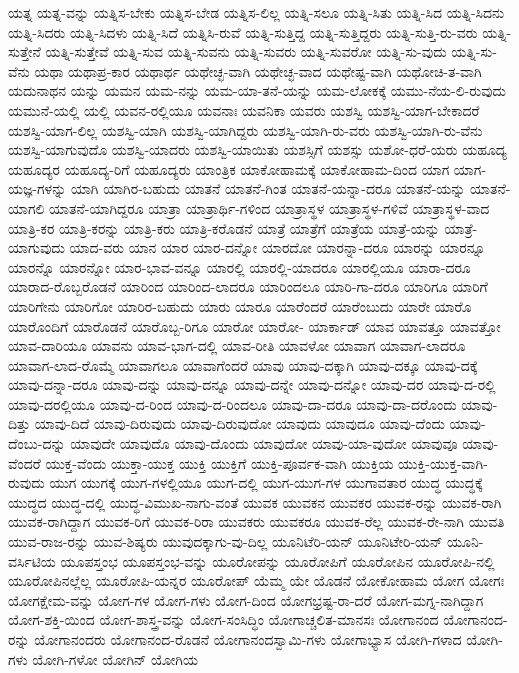 {ಯತ್ನ
ಯತ್ನ-ವನ್ನು
ಯತ್ನಿಸ-ಬೇಕು
ಯತ್ನಿಸ-ಬೇಡ
ಯತ್ನಿಸ-ಲಿಲ್ಲ
ಯತ್ನಿ-ಸಲೂ
ಯತ್ನಿ-ಸಿತು
ಯತ್ನಿ-ಸಿದ
ಯತ್ನಿ-ಸಿದನು
ಯತ್ನಿ-ಸಿದರು
ಯತ್ನಿ-ಸಿದಳು
ಯತ್ನಿ-ಸಿದೆ
ಯತ್ನಿಸಿ-ರುವೆ
ಯತ್ನಿ-ಸುತ್ತಿದ್ದ
ಯತ್ನಿ-ಸುತ್ತಿದ್ದರು
ಯತ್ನಿ-ಸುತ್ತಿ-ರು-ವರು
ಯತ್ನಿ-ಸುತ್ತೇನೆ
ಯತ್ನಿ-ಸುತ್ತೇವೆ
ಯತ್ನಿ-ಸುವ
ಯತ್ನಿ-ಸುವನು
ಯತ್ನಿ-ಸುವರು
ಯತ್ನಿ-ಸುವರೋ
ಯತ್ನಿ-ಸು-ವುದು
ಯತ್ನಿ-ಸು-ವೆನು
ಯಥಾ
ಯಥಾಪ್ರ-ಕಾರ
ಯಥಾರ್ಥ
ಯಥೇಚ್ಛ-ವಾಗಿ
ಯಥೇಚ್ಛ-ವಾದ
ಯಥೇಷ್ಟ-ವಾಗಿ
ಯಥೋಚಿ-ತ-ವಾಗಿ
ಯದುನಾಥನ
ಯನ್ನು
ಯಮನ
ಯಮ-ನನ್ನು
ಯಮ-ಯಾ-ತನೆ-ಯನ್ನು
ಯಮ-ಲೋಕಕ್ಕೆ
ಯಮು-ನೆಯ-ಲಿ-ರುವುದು
ಯಮುನೆ-ಯಲ್ಲಿ
ಯಲ್ಲಿ
ಯವನ-ರಲ್ಲಿಯೂ
ಯವನಾಃ
ಯವನಿಕಾ
ಯವರು
ಯಶಸ್ವಿ
ಯಶಸ್ವಿ-ಯಾಗ-ಬೇಕಾದರೆ
ಯಶಸ್ವಿ-ಯಾಗ-ಲಿಲ್ಲ
ಯಶಸ್ವಿ-ಯಾಗಿ
ಯಶಸ್ವಿ-ಯಾಗಿದ್ದರು
ಯಶಸ್ವಿ-ಯಾಗಿ-ರು-ವರು
ಯಶಸ್ವಿ-ಯಾಗಿ-ರು-ವೆನು
ಯಶಸ್ವಿ-ಯಾಗುವುದೊ
ಯಶಸ್ವಿ-ಯಾದರು
ಯಶಸ್ವಿ-ಯಾಯಿತು
ಯಶಸ್ಸಿಗೆ
ಯಶಸ್ಸು
ಯಶೋ-ಧರೆ-ಯರು
ಯಹೂದ್ಯ
ಯಹೂದ್ಯರ
ಯಹೂದ್ಯ-ರಿಗೆ
ಯಹೂದ್ಯರು
ಯಾಂತ್ರಿಕ
ಯಾಕೋಹಾಮಕ್ಕೆ
ಯಾಕೋಹಾಮ-ದಿಂದ
ಯಾಗ
ಯಾಗ-ಯಜ್ಞ-ಗಳನ್ನು
ಯಾಗಿ
ಯಾಗಿರ-ಬಹುದು
ಯಾತನೆ
ಯಾತನೆ-ಗಿಂತ
ಯಾತನೆ-ಯನ್ನಾ-ದರೂ
ಯಾತನೆ-ಯನ್ನು
ಯಾತನೆ-ಯಾಗಲಿ
ಯಾತನೆ-ಯಾಗಿದ್ದರೂ
ಯಾತ್ರಾ
ಯಾತ್ರಾರ್ಥಿ-ಗಳಿಂದ
ಯಾತ್ರಾಸ್ಥಳ
ಯಾತ್ರಾಸ್ಥಳ-ಗಳಿವೆ
ಯಾತ್ರಾಸ್ಥಳ-ವಾದ
ಯಾತ್ರಿ-ಕರ
ಯಾತ್ರಿ-ಕರನ್ನು
ಯಾತ್ರಿ-ಕರು
ಯಾತ್ರಿ-ಕರೊಡನೆ
ಯಾತ್ರೆ
ಯಾತ್ರೆಗೆ
ಯಾತ್ರೆಯ
ಯಾತ್ರೆ-ಯನ್ನು
ಯಾತ್ರೆ-ಯಾಗುವುದು
ಯಾದ-ವರು
ಯಾನ
ಯಾರ
ಯಾರ-ದನ್ನೋ
ಯಾರದೋ
ಯಾರನ್ನಾ-ದರೂ
ಯಾರನ್ನು
ಯಾರನ್ನೂ
ಯಾರನ್ನೊ
ಯಾರನ್ನೋ
ಯಾರ-ಭಾವ-ವನ್ನೂ
ಯಾರಲ್ಲಿ
ಯಾರಲ್ಲಿ-ಯಾದರೂ
ಯಾರಲ್ಲಿಯೂ
ಯಾರಾ-ದರೂ
ಯಾರಾದ-ರೊಬ್ಬರೊಡನೆ
ಯಾರಿಂದ
ಯಾರಿಂದ-ಲಾದರೂ
ಯಾರಿಂದಲೂ
ಯಾರಿ-ಗಾ-ದರೂ
ಯಾರಿಗೂ
ಯಾರಿಗೆ
ಯಾರಿಗೇನು
ಯಾರಿಗೋ
ಯಾರಿರ-ಬಹುದು
ಯಾರು
ಯಾರೂ
ಯಾರೆಂದರೆ
ಯಾರೆಂಬುದು
ಯಾರೇ
ಯಾರೊ
ಯಾರೊಂದಿಗೆ
ಯಾರೊಡನೆ
ಯಾರೊಬ್ಬ-ರಿಗೂ
ಯಾರೋ
ಯಾರೋ-
ಯಾರ್ಕಾಡ್
ಯಾವ
ಯಾವತ್ತೂ
ಯಾವತ್ತೋ
ಯಾವ-ದಾರಿಯೂ
ಯಾವನು
ಯಾವ-ಭಾಗ-ದಲ್ಲಿ
ಯಾವ-ರೀತಿ
ಯಾವಳೋ
ಯಾವಾಗ
ಯಾವಾಗ-ಲಾದರೂ
ಯಾವಾಗ-ಲಾದ-ರೊಮ್ಮೆ
ಯಾವಾಗಲೂ
ಯಾವಾಗೆಂದರೆ
ಯಾವು
ಯಾವು-ದಕ್ಕಾಗಿ
ಯಾವು-ದಕ್ಕೂ
ಯಾವು-ದಕ್ಕೆ
ಯಾವು-ದನ್ನಾ-ದರೂ
ಯಾವು-ದನ್ನು
ಯಾವು-ದನ್ನೂ
ಯಾವು-ದನ್ನೇ
ಯಾವು-ದನ್ನೋ
ಯಾವು-ದರ
ಯಾವು-ದ-ರಲ್ಲಿ
ಯಾವು-ದರಲ್ಲಿಯೂ
ಯಾವು-ದ-ರಿಂದ
ಯಾವು-ದ-ರಿಂದಲೂ
ಯಾವು-ದಾ-ದರೂ
ಯಾವು-ದಾ-ದರೊಂದು
ಯಾವು-ದಿತ್ತು
ಯಾವು-ದಿದೆ
ಯಾವು-ದಿರುವುದು
ಯಾವು-ದಿರುವುದೋ
ಯಾವುದು
ಯಾವುದೂ
ಯಾವು-ದೆಂದು
ಯಾವು-ದೆಂಬು-ದನ್ನು
ಯಾವುದೇ
ಯಾವುದೊ
ಯಾವು-ದೊಂದು
ಯಾವುದೋ
ಯಾವು-ಯಾ-ವುದೋ
ಯಾವುವೂ
ಯಾವು-ವೆಂದರೆ
ಯುಕ್ತ-ವೆಂದು
ಯುಕ್ತಾ-ಯುಕ್ತ
ಯುಕ್ತಿ
ಯುಕ್ತಿಗೆ
ಯುಕ್ತಿ-ಪೂರ್ವಕ-ವಾಗಿ
ಯುಕ್ತಿಯ
ಯುಕ್ತಿ-ಯುಕ್ತ-ವಾಗಿ-ರುವುದು
ಯುಗ
ಯುಗಕ್ಕೆ
ಯುಗ-ಗಳಲ್ಲಿಯೂ
ಯುಗ-ದಲ್ಲಿ
ಯುಗ-ಯುಗ-ಗಳ
ಯುಗಾವತಾರ
ಯುದ್ಧ
ಯುದ್ಧಕ್ಕೆ
ಯುದ್ಧದ
ಯುದ್ಧ-ದಲ್ಲಿ
ಯುದ್ಧ-ವಿಮುಖ-ನಾಗು-ವಂತೆ
ಯುವಕ
ಯುವಕನ
ಯುವಕರ
ಯುವಕ-ರನ್ನು
ಯುವಕ-ರಾಗಿ
ಯುವಕ-ರಾಗಿದ್ದಾಗ
ಯುವಕ-ರಿಗೆ
ಯುವಕ-ರಿರಾ
ಯುವಕರು
ಯುವಕರೂ
ಯುವಕ-ರೆಲ್ಲ
ಯುವಕ-ರೇ-ನಾಗಿ
ಯುವತಿ
ಯುವ-ರಾಜ-ರನ್ನು
ಯುವ-ಶಿಷ್ಯರು
ಯುವುದಕ್ಕಾಗು-ವು-ದಿಲ್ಲ
ಯೂನಿಟೆರಿ-ಯನ್
ಯೂನಿಟೇರಿ-ಯನ್
ಯೂನಿ-ವರ್ಸಿಟಿಯ
ಯೂಪಸ್ತಂಭ
ಯೂಪಸ್ತಂಭ-ವನ್ನು
ಯೂರೋಪನ್ನು
ಯೂರೋಪಿಗೆ
ಯೂರೋಪಿನ
ಯೂರೋಪಿ-ನಲ್ಲಿ
ಯೂರೋಪಿನಲ್ಲೆಲ್ಲ
ಯೂರೋಪಿ-ಯನ್ನರ
ಯೂರೋಪ್
ಯೆಮ್ಮ
ಯೇ
ಯೊಡನೆ
ಯೋಕೋಹಾಮ
ಯೋಗ
ಯೋಗಃ
ಯೋಗಕ್ಷೇಮ-ವನ್ನು
ಯೋಗ-ಗಳ
ಯೋಗ-ಗಳು
ಯೋಗ-ದಿಂದ
ಯೋಗಭ್ರಷ್ಟ-ರಾ-ದರೆ
ಯೋಗ-ಮಗ್ನ-ನಾಗಿದ್ದಾಗ
ಯೋಗ-ಶಕ್ತಿ-ಯಿಂದ
ಯೋಗ-ಶಾಸ್ತ್ರ-ವನ್ನು
ಯೋಗ-ಸಂಸಿದ್ಧಿಂ
ಯೋಗಾಚ್ಚಲಿತ-ಮಾನಸಃ
ಯೋಗಾನಂದ
ಯೋಗಾನಂದ-ರನ್ನು
ಯೋಗಾನಂದರು
ಯೋಗಾನಂದ-ರೊಡನೆ
ಯೋಗಾನಂದಸ್ವಾಮಿ-ಗಳು
ಯೋಗಾಭ್ಯಾಸ
ಯೋಗಿ-ಗಳಾದ
ಯೋಗಿ-ಗಳು
ಯೋಗಿ-ಗಳೋ
ಯೋಗಿನ್
ಯೋಗಿಯ
}
